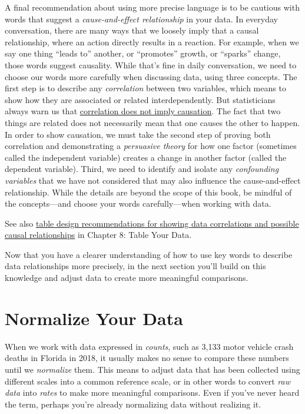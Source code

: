 \documentclass[
  english,
]{book}
\begin{document}
A final recommendation about using more precise language is to be cautious with words that suggest a \emph{cause-and-effect relationship} in your data. In everyday conversation, there are many ways that we loosely imply that a causal relationship, where an action directly results in a reaction. For example, when we say one thing ``leads to'' another, or ``promotes'' growth, or ``sparks'' change, those words suggest causality. While that's fine in daily conversation, we need to choose our words more carefully when discussing data, using three concepts. The first step is to describe any \emph{correlation} between two variables, which means to show how they are associated or related interdependently. But statisticians always warn us that \href{https://en.wikipedia.org/wiki/Correlation_does_not_imply_causation}{correlation does not imply causation}. The fact that two things are related does not necessarily mean that one causes the other to happen. In order to show causation, we must take the second step of proving both correlation and demonstrating a \emph{persuasive theory} for how one factor (sometimes called the independent variable) creates a change in another factor (called the dependent variable). Third, we need to identify and isolate any \emph{confounding variables} that we have not considered that may also influence the cause-and-effect relationship. While the details are beyond the scope of this book, be mindful of the concepts---and choose your words carefully---when working with data.

See also \href{table-design.html}{table design recommendations for showing data correlations and possible causal relationships} in Chapter 8: Table Your Data.

Now that you have a clearer understanding of how to use key words to describe data relationships more precisely, in the next section you'll build on this knowledge and adjust data to create more meaningful comparisons.

\hypertarget{normalize}{%
\section*{Normalize Your Data}\label{normalize}}

When we work with data expressed in \emph{counts}, such as 3,133 motor vehicle crash deaths in Florida in 2018, it usually makes no sense to compare these numbers until we \emph{normalize} them. This means to adjust data that has been collected using different scales into a common reference scale, or in other words to convert \emph{raw data} into \emph{rates} to make more meaningful comparisons. Even if you've never heard the term, perhaps you're already normalizing data without realizing it.
\end{document}
